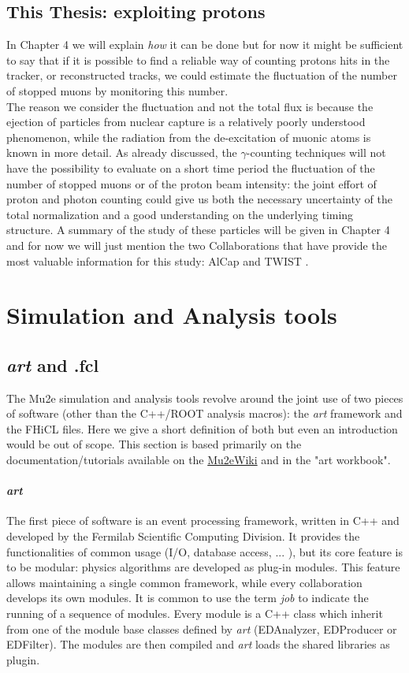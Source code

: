 \documentclass[12pt,a4paper,openright, oneside, titlepage]{book} %
\begin{document}
\subsection{This Thesis: exploiting protons}
In Chapter 4 we will explain \textit{how} it can be done but for now 
it might be sufficient to say that if it is possible to find a reliable way of counting protons hits in the tracker, 
or reconstructed tracks, we could estimate the fluctuation of the number of stopped muons by monitoring this number.\\
The reason we consider the fluctuation and not the total flux is because the ejection of particles from nuclear capture is a relatively poorly understood phenomenon, while the radiation from the de-excitation of muonic atoms is known in more detail. 
As already discussed, the $\gamma$-counting techniques will not have the possibility to evaluate on a short time period the fluctuation of the number of stopped muons or of the proton beam intensity: the joint effort of proton and photon counting could give us both the necessary uncertainty of the total normalization and a good understanding on the underlying timing structure.
A summary of the study of these particles will be given in Chapter 4 and for now we will just mention 
the two Collaborations that have provide the most valuable information for this study: AlCap \cite{AlCap:2018} and TWIST \cite{TWIST:2020}.

\section{Simulation and Analysis tools}
\subsection{\textit{art} and .fcl}
The Mu2e simulation and analysis tools revolve around the joint use of two pieces of software (other than the C++/ROOT analysis macros): the \textit{art} framework and the FHiCL files. Here we give a short definition of both but even an introduction would be out of scope. This section is based primarily on the documentation/tutorials available on the  \href{https://mu2ewiki.fnal.gov/}{Mu2eWiki} and in the "art workbook"\cite{art}.

\paragraph{\textit{art}} The first piece of software is an event processing framework, written in C++ and developed by the Fermilab Scientific Computing Division. It provides the functionalities of common usage (I/O, database access, ... ), but its core feature is to be modular: physics algorithms are developed as plug-in modules. 
This feature allows maintaining a single common framework, while every collaboration develops its own modules. 
It is common to use the term \textit{job} to indicate the running of a sequence of modules.   
Every module is a C++ class which inherit from one of the module base classes defined by \textit{art} (EDAnalyzer, EDProducer or EDFilter). The modules are then compiled and \textit{art} loads the shared libraries as plugin.
\end{document}
